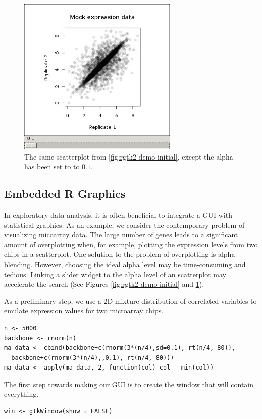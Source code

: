\documentclass[article]{jss}
\begin{document}
\begin{figure}
\begin{center}
\includegraphics[width=3in]{demo-alpha-random-01-3}
\caption{\label{fig:rgtk2-demo-final}The same scatterplot from 
\ref{fig:rgtk2-demo-initial}, except the alpha has been set to to $0.1$.}
\end{center}
\end{figure}

\subsection{Embedded R Graphics}

In exploratory data analysis, it is often beneficial to integrate
a GUI with statistical graphics. As an example, we consider the contemporary
problem of visualizing micoarray data. The large number of genes leads
to a significant amount of overplotting when, for example, plotting
the expression levels from two chips in a scatterplot. One solution
to the problem of overplotting is alpha blending. However, choosing
the ideal alpha level may be time-consuming and tedious. Linking a
slider widget to the alpha level of an  scatterplot may accelerate
the search (See Figures \ref{fig:rgtk2-demo-initial} and \ref{fig:rgtk2-demo-final}). 

As a preliminary step, we use a 2D mixture distribution of correlated variables
to emulate expression values for two microarray chips. 
\begin{verbatim}
n <- 5000
backbone <- rnorm(n)
ma_data <- cbind(backbone+c(rnorm(3*(n/4),sd=0.1), rt(n/4, 80)), 
  backbone+c(rnorm(3*(n/4),,0.1), rt(n/4, 80)))
ma_data <- apply(ma_data, 2, function(col) col - min(col))
\end{verbatim}

The first step towards making our GUI is to create the window that
will contain everything. 
\begin{verbatim}
win <- gtkWindow(show = FALSE)
\end{verbatim}
\end{document}
